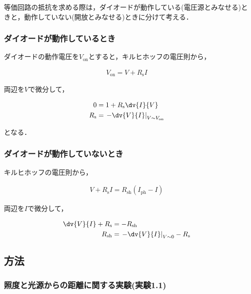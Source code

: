 \documentclass[1_power_supply.tex]{subfiles}
\begin{document}
    等価回路の抵抗を求める際は，ダイオードが動作している(電圧源とみなせる)ときと，動作していない(開放とみなせる)ときに分けて考える．

    \subsubsection{ダイオードが動作しているとき}

      ダイオードの動作電圧を$V_\mathrm{on}$とすると，キルヒホッフの電圧則から，

      \begin{align}
        V_\mathrm{on} = V+R_\mathrm{s}I
      \end{align}

      両辺を$V$で微分して，

      \begin{align}
        0            &= 1+R_\mathrm{s}\dv{I}{V}  \\
        R_\mathrm{s} &= \left.- \dv{V}{I}\right|_{V\sim V_\mathrm{on}} \label{eq:R_s}
      \end{align}

      となる．

    \subsubsection{ダイオードが動作していないとき}

      キルヒホッフの電圧則から，

      \begin{align}
        V+R_\mathrm{s}I = R_\mathrm{sh}(I_\mathrm{ph}-I)
      \end{align}

      両辺を$I$で微分して，

      \begin{align}
        \dv{V}{I}+R_\mathrm{s} &= -R_\mathrm{sh}  \\
        R_\mathrm{sh}          &= \left.-\dv{V}{I}\right|_{V\sim 0}-R_\mathrm{s} \label{eq:R_sh}
      \end{align}

  \subsection{方法}

    \subsubsection{照度と光源からの距離に関する実験(実験1.1)}
\end{document}
